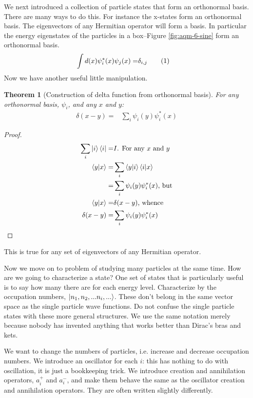 \documentclass[]{article}
\newcommand\numberthis{\addtocounter{equation}{1}\tag{\theequation}}
\newtheorem{thm}{Theorem}
\begin{document}
We next introduced  a collection of particle states that form an orthonormal basis. There are many ways to do this. For instance the x-states form an orthonormal basis. The eigenvectors of any Hermitian operator will form a basis. In particular the energy eigenstates of the particles in a box--Figure \ref{fig:aqm-6-sine} form an orthonormal basis. 
\begin{align*}
		\int d(x) \psi^*_i(x) \psi_j(x) =& \delta_{i,j} \numberthis \label{eq:orthog:psi}
\end{align*}
Now we have another useful little manipulation. 

\begin{thm}[Construction of delta function from orthonormal basis]\label{thm:orthonormal}
	For any orthonormal basis, $\psi_i$, and any $x$ and $y$:
	\begin{align*}
		\delta(x-y)=& \sum_{i} \psi_i(y) \psi^*_i(x)
	\end{align*}
\end{thm}

\begin{proof}
	\begin{align*}
		\sum_{i} \ket{i} \bra{i} =& I \text{. For any $x$ and $y$}\\
		\braket{y|x}=& \sum_{i} \braket{y|i} \braket{i|x}\\
		=& \sum_{i} \psi_i(y) \psi^*_i(x) \text{, but}\\
		\braket{y|x}=&\delta(x-y) \text{, whence}\\
		\delta(x-y)=& \sum_{i} \psi_i(y) \psi^*_i(x)
	\end{align*}
\end{proof}

This is true for any set of eigenvectors of any Hermitian operator.

Now we move on to problem of studying many particles at the same time. How are we going to characterize a state? One set of states that is particularly useful is to say how many there are for each energy level. Characterize by the occupation numbers,  $\ket{n_1, n_2,...n_i,...}$. These don't belong in the same vector space as the single particle wave functions. Do not confuse the single particle states with these more general structures. We use the same notation merely because nobody has invented anything that works better than Dirac's bras and kets.

We want to change the numbers of particles, i.e. increase and decrease occupation numbers. We introduce an oscillator for each $i$: this has nothing to do with oscillation, it is just a bookkeeping trick. We introduce creation and annihilation operators, $a^+_i$ and $a^-_i$, and make them behave the same as the oscillator creation and annihilation operators. They are often written slightly differently.
\end{document}
